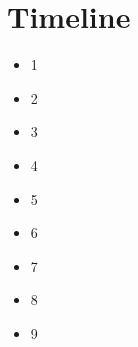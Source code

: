 \section{Timeline}
\begin{itemize}

\item 1

\item 2

\item 3

\item 4

\item 5

\item 6

\item 7

\item 8

\item 9
\end{itemize}
